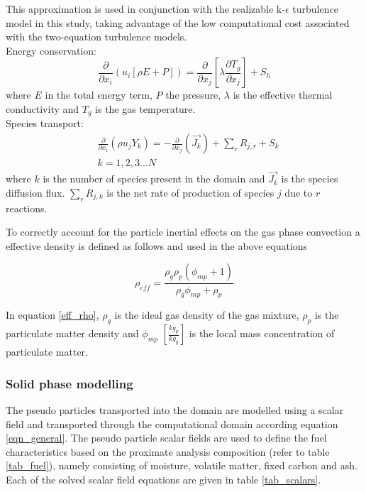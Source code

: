 \documentclass{webofc}
\begin{document}
This approximation is used in conjunction with the realizable k-$\epsilon$ turbulence model \cite{shih} in this study, taking advantage of the low computational cost associated with the two-equation turbulence models. 
\\
Energy conservation:
\begin{equation}\label{eqn_energy}
\frac{\partial }{\partial x_{i}} (u_{i}[\rho E+P])=\frac{\partial }{\partial x_{j}}\left[\lambda\frac{\partial T_{g}}{\partial x_{j}}\right] +S_{h}
\end{equation}
where $E$ in the total energy term, $P$ the pressure, $\lambda$ is the effective thermal conductivity and $T_g$ is the gas temperature.\\
Species transport:
\begin{equation}\label{eqn_species}
\begin{split}
&\frac{\partial}{\partial x_{i}}(\rho u_{j}Y_{k})=-\frac{\partial}{\partial x_{j}}(\vec{J_{k}})+ \sum_r R_{j,r} + S_{k}\\
&k = 1,2,3...N
\end{split}
\end{equation}
where $k$ is the number of species present in the domain and $\vec{J_{k}}$ is the species diffusion flux. $\sum_r R_{j,k}$ is the net rate of production of species $j$ due to $r$ reactions.

 To correctly account for the particle inertial effects on the gas phase convection a effective density is defined as follows and used in the above equations

\begin{equation} \label{eff_rho}
	\rho_{eff} = \frac{\rho_{g} \rho_p \left( \phi_{mp} + 1 \right)}{\rho_g \phi_{mp} + \rho_p}
\end{equation}

In equation \eqref{eff_rho}, $\rho_g$ is the ideal gas density of the gas mixture, $\rho_p$ is the particulate matter density and $\phi_{mp}$ $[\frac{kg_p}{kg_g}]$ is the local mass concentration of particulate matter. 

\subsubsection{Solid phase modelling}
The pseudo particles transported into the domain are modelled using a scalar field and transported through the computational domain according equation \ref{eqn_general}. The pseudo particle scalar fields are used to define the fuel characteristics based on the proximate analysis composition (refer to table \ref{tab_fuel}), namely consisting of moisture, volatile matter, fixed  carbon and ash. Each of the solved scalar field equations are given in table \ref{tab_scalars}.\\
\end{document}
